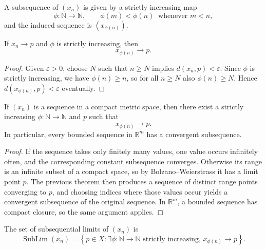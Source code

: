 \begin{definition}
\label{def:subsequence}
A subsequence of $(x_n)$ is given by a strictly increasing map
\[
\phi:\mathbb{N}\to\mathbb{N},\qquad \phi(m)<\phi(n)\ \text{ whenever }m<n,
\]
and the induced sequence is $(x_{\phi(n)})$.
\end{definition}

\begin{theorem}
\label{thm:subsequence-of-convergent}
If $x_n \to p$ and $\phi$ is strictly increasing, then
\[
x_{\phi(n)} \to p.
\]
\begin{proof}
Given $\varepsilon>0$, choose $N$ such that $n\ge N$ implies $d(x_n,p)<\varepsilon$. Since
$\phi$ is strictly increasing, we have $\phi(n)\ge n$, so for all $n\ge N$ also
$\phi(n)\ge N$. Hence $d(x_{\phi(n)},p)<\varepsilon$ eventually.
\end{proof}
\end{theorem}

\begin{theorem}
\label{thm:compact-has-convergent-subsequence}
If $(x_n)$ is a sequence in a compact metric space, then there exist a strictly increasing
$\phi:\mathbb{N}\to\mathbb{N}$ and $p$ such that
\[
x_{\phi(n)} \to p.
\]
In particular, every bounded sequence in $\mathbb{R}^m$ has a convergent subsequence.
\begin{proof}
If the sequence takes only finitely many values, one value occurs infinitely often, and the
corresponding constant subsequence converges. Otherwise its range is an infinite subset of a
compact space, so by Bolzano--Weierstrass it has a limit point $p$. The previous theorem then
produces a sequence of distinct range points converging to $p$, and choosing indices where
those values occur yields a convergent subsequence of the original sequence. In $\mathbb{R}^m$,
a bounded sequence has compact closure, so the same argument applies.
\end{proof}
\end{theorem}

\begin{definition}
\label{def:subsequential-limits}
The set of subsequential limits of $(x_n)$ is
\[
\operatorname{SubLim}(x_n)
=
\left\{
p \in X : \exists \phi:\mathbb{N}\to\mathbb{N}\text{ strictly increasing, }x_{\phi(n)}\to p
\right\}.
\]
\end{definition}

